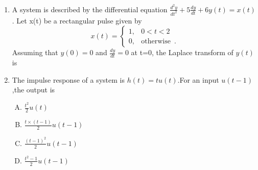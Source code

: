 \documentclass[journal,12pt,twocolumn]{IEEEtran}
\begin{document}
\begin{enumerate}[1.]
\begin{enumerate}[(A)]
\end{enumerate}

\item A system is described by the differential equation $\frac{d^{2}y}{dt^{2}}+5\frac{dy}{dt}+6y(t)=x(t)$. Let x(t)  be a rectangular pulse given by\[
	x(t)=\begin{cases}
		1, & \text{$0<t<2$}  \\
		0, & \text{otherwise }\,.
	\end{cases}
\] Assuming that $y(0)=0$ and $\frac{dy}{dt}=0$ at t=0, the Laplace transform of $y(t)$ is

\begin{enumerate}[(A)]

\end{enumerate}










\item The impulse response of a system is $h(t)=tu(t)$.For an input $u(t-1)$,the output is
\begin{enumerate}[(A)]

\setlength\itemsep{1em}

\item $\frac{t^{2}}{2}u(t)$
\item $\frac{t\times (t-1)}{2}u(t-1)$
\item $\frac{(t-1)^{2}}{2}u(t-1)$
\item $\frac{t^{2}-1}{2}u(t-1)$
\end{enumerate}


\end{enumerate}
\end{document}
